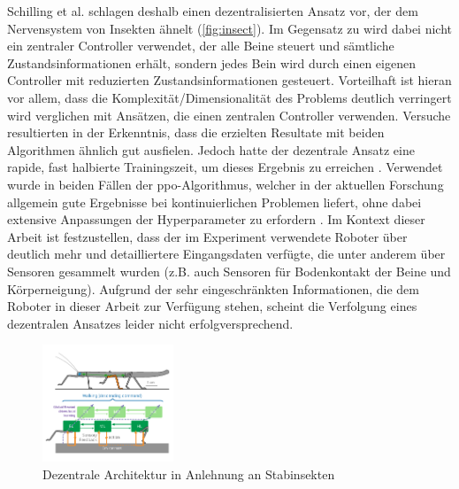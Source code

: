 Schilling et al. \cite{schilling2020decentralized} schlagen deshalb einen dezentralisierten Ansatz vor, der dem Nervensystem von Insekten ähnelt (\autoref{fig:insect}).
Im Gegensatz zu \cite{waidner.2020} wird dabei nicht ein zentraler Controller verwendet, der alle Beine steuert und sämtliche Zustandsinformationen erhält, sondern jedes Bein wird durch einen eigenen Controller mit reduzierten Zustandsinformationen gesteuert.
Vorteilhaft ist hieran vor allem, dass die Komplexität/Dimensionalität des Problems deutlich verringert wird verglichen mit Ansätzen, die einen zentralen Controller verwenden.
Versuche resultierten in der Erkenntnis, dass die erzielten Resultate mit beiden Algorithmen ähnlich gut ausfielen.
Jedoch hatte der dezentrale Ansatz eine rapide, fast halbierte Trainingszeit, um dieses Ergebnis zu erreichen \cite{schilling2020decentralized}.
Verwendet wurde in beiden Fällen der \ac{ppo}-Algorithmus, welcher in der aktuellen Forschung allgemein gute Ergebnisse bei kontinuierlichen Problemen liefert, ohne dabei extensive Anpassungen der Hyperparameter zu erfordern \cite{schilling2020decentralized}.
Im Kontext dieser Arbeit ist festzustellen, dass der im Experiment verwendete Roboter über deutlich mehr und detailliertere Eingangsdaten verfügte, die unter anderem über Sensoren gesammelt wurden (z.B. auch Sensoren für Bodenkontakt der Beine und Körperneigung).
Aufgrund der sehr eingeschränkten Informationen, die dem Roboter in dieser Arbeit zur Verfügung stehen, scheint die Verfolgung eines dezentralen Ansatzes leider nicht erfolgversprechend.

\begin{figure}
    \centering
    \includegraphics[width = 0.35\textwidth]{Bilder/decentralized-insect.pdf}
    \caption{Dezentrale Architektur in Anlehnung an Stabinsekten \cite{schilling2020decentralized}}
    \label{fig:insect}
\end{figure}

    
